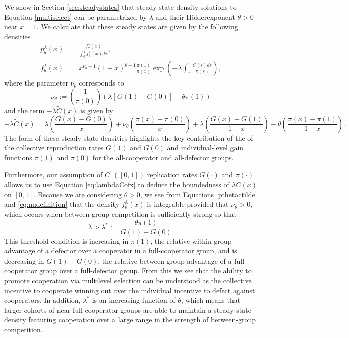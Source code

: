\documentclass[11pt]{article}
\numberwithin{equation}{section}
\newcommand{\holder}{H{\"o}lder\:}
\newcommand{\paren}[1]{\left(#1\right)}
\begin{document}
{We show in Section \ref{sec:steadystates} that steady state density solutions to Equation \eqref{multiselect} can be parametrized by $\lambda$ and their \holder exponent $\theta > 0$ near $x=1$. We calculate that these steady states are given by the following densities
\begin{equation}\label{pthetactilde}
\begin{split}
p^{\lambda}_{\theta}(x)&=\frac{f^{\lambda}_{\theta}(x)}{\int_0^1 f^{\lambda}_{\theta}(x)dx},\\
f^{\lambda}_{\theta}(x)&= x^{\nu_{\theta}- 1}(1-x)^{\theta-1}\frac{\pi(1)}{\pi(x)}\exp\paren{ - \lambda \int_x^1\frac{\tilde{C}(s)ds}{\pi(s)}},
\end{split}
\end{equation}
where the parameter $\nu_\theta$ corresponds to 
\begin{equation} \label{eq:nudefinition}
    \nu_{\theta}:= \left(\frac{1}{\pi(0)}\right) \left( \lambda \left[G(1) - G(0) \right] - \theta \pi(1) \right)
\end{equation}
and the term $-\lambda \tilde{C}(x)$ is given by
\begin{dmath} \label{eq:lambdaCofx}
- \lambda \tilde{C}(x) = \lambda \left( \frac{G(x) - G(0)}{x} \right) + \nu_\theta \left( \frac{\pi(x) - \pi(0)}{x} \right)  
+ \lambda \left( \frac{G(x) - G(1) }{1 - x} \right) - \theta \left( \frac{\pi(x) - \pi(1)}{1 - x} \right).
\end{dmath}
The form of these steady state densities highlights the key contribution of the of the collective reproduction rates $G(1)$ and $G(0)$ and individual-level gain functions $\pi(1)$ and $\pi(0)$ for the all-cooperator and all-defector groups. 

Furthermore, our assumption of $C^1([0,1])$ replication rates $G(\cdot)$ and $\pi(\cdot)$ allows us to use Equation \eqref{eq:lambdaCofx} to deduce the boundedness of $\lambda \tilde{C}(x)$ on $[0,1]$.  Because we are considering $\theta > 0$, we see from Equations \eqref{pthetactilde} and \eqref{eq:nudefinition} that the density $f^{\lambda}_{\theta}(x)$ is integrable provided that $\nu_{\theta}> 0$, which occurs when between-group competition is sufficiently strong so that
%
\begin{equation} \label{eq:lambdastar}
    \lambda > \lambda^* := \frac{\theta \pi(1)}{G(1) - G(0)}.
\end{equation}
This threshold condition is increasing in $\pi(1)$, the relative within-group advantage of a defector over a cooperator in a full-cooperator group, and is decreasing in $G(1) - G(0)$, the relative between-group advantage of a full-cooperator group over a full-defector group. From this we see that the ability to promote cooperation via multilevel selection can be understood as the collective incentive to cooperate winning out over the individual incentive to defect against cooperators. In addition, $\lambda^*$ is an increasing function of $\theta$, which means that larger cohorts of near full-cooperator groups are able to maintain a steady state density featuring cooperation over a large range in the strength of between-group competition. 

}
\end{document}
